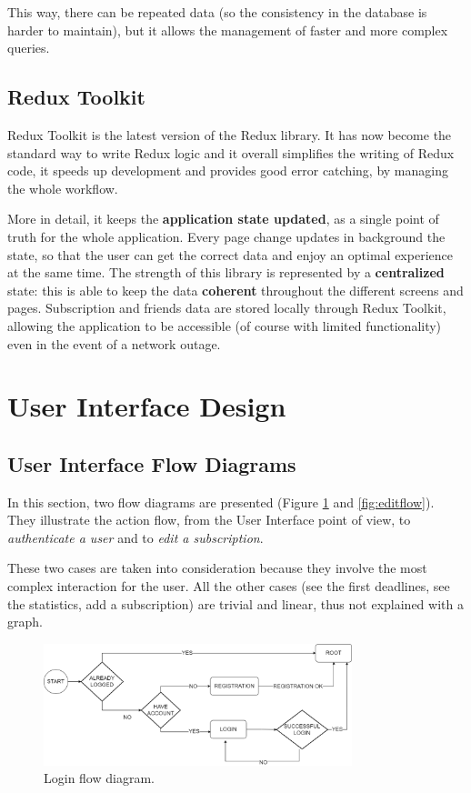 \documentclass[12pt]{article}
\begin{document}
This way, there can be repeated data (so the consistency in the database is harder to maintain), but it allows the management of faster and more complex queries.


\subsection{Redux Toolkit}
Redux Toolkit is the latest version of the Redux library. It has now become the standard way to write Redux logic and it overall simplifies the writing of Redux code, it speeds up development and provides good error catching, by managing the whole workflow.

More in detail, it keeps the \textbf{application state updated}, as a single point of truth for the whole application. Every page change updates in background the state, so that the user can get the correct data and enjoy an optimal experience at the same time. The strength of this library is represented by a \textbf{centralized} state: this is able to keep the data \textbf{coherent} throughout the different screens and pages.
Subscription and friends data are stored locally through Redux Toolkit, allowing the application to be accessible (of course with limited functionality) even in the event of a network outage.


\newpage
\section{User Interface Design}\label{sec:ui}

\subsection{User Interface Flow Diagrams}
In this section, two flow diagrams are presented (Figure \ref{fig:loginflow} and \ref{fig:editflow}). They illustrate the action flow, from the User Interface point of view, to \textit{authenticate a user} and to \textit{edit a subscription}.

These two cases are taken into consideration because they involve the most complex interaction for the user. All the other cases (see the first deadlines, see the statistics, add a subscription) are trivial and linear, thus not explained with a graph.

\begin{figure}[h!]
    \begin{center}
        \includegraphics[width=0.8\textwidth, clip]{../../assets/loginFlow.png}
    \end{center}
    \caption{Login flow diagram.}
    \label{fig:loginflow}
\end{figure}
\end{document}
